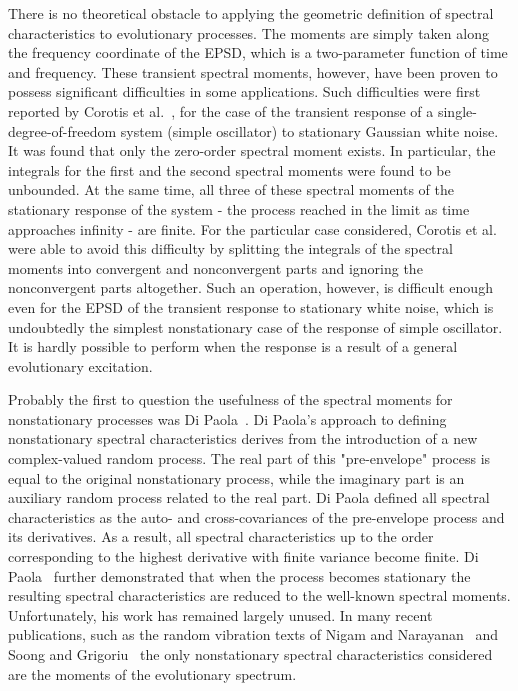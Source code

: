 \documentclass{article}
\begin{document}
There is no theoretical obstacle to applying the geometric definition of
spectral characteristics to evolutionary processes. The moments are simply
taken along the frequency coordinate of the EPSD, which is a two-parameter
function of time and frequency. These transient spectral moments, however,
have been proven to possess significant difficulties in some applications.
Such difficulties were first reported by Corotis et al.~{\cite{Corotis1972}},
for the case of the transient response of a single-degree-of-freedom system
(simple oscillator) to stationary Gaussian white noise. It was found that only
the zero-order spectral moment exists. In particular, the integrals for the
first and the second spectral moments were found to be unbounded. At the same
time, all three of these spectral moments of the stationary response of the
system - the process reached in the limit as time approaches infinity - are
finite. For the particular case considered, Corotis et
al.~{\cite{Corotis1972}} were able to avoid this difficulty by splitting the
integrals of the spectral moments into convergent and nonconvergent parts and
ignoring the nonconvergent parts altogether. Such an operation, however, is
difficult enough even for the EPSD of the transient response to stationary
white noise, which is undoubtedly the simplest nonstationary case of the
response of simple oscillator. It is hardly possible to perform when the
response is a result of a general evolutionary excitation.

Probably the first to question the usefulness of the spectral moments for
nonstationary processes was Di Paola~{\cite{DiPaola1985}}. Di Paola's approach
to defining nonstationary spectral characteristics derives from the
introduction of a new complex-valued random process. The real part of this
"pre-envelope" process is equal to the original nonstationary process, while
the imaginary part is an auxiliary random process related to the real part. Di
Paola defined all spectral characteristics as the auto- and cross-covariances
of the pre-envelope process and its derivatives. As a result, all spectral
characteristics up to the order corresponding to the highest derivative with
finite variance become finite. Di Paola~{\cite{DiPaola1985}} further
demonstrated that when the process becomes stationary the resulting spectral
characteristics are reduced to the well-known spectral moments. Unfortunately,
his work has remained largely unused. In many recent publications, such as the
random vibration texts of Nigam and Narayanan~{\cite{NigamNarayanan1994}} and
Soong and Grigoriu~{\cite{SoongGrigoriu1993}} the only nonstationary spectral
characteristics considered are the moments of the evolutionary spectrum.
\end{document}
